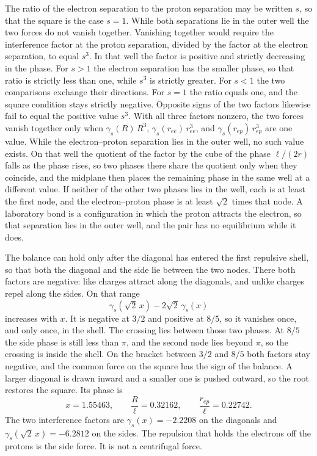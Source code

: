 \documentclass[a4paper]{article}
\begin{document}
The ratio of the electron separation to the proton separation may be written \(s\), so that the square is the case \(s=1\). While both separations lie in the outer well the two forces do not vanish together. Vanishing together would require the interference factor at the proton separation, divided by the factor at the electron separation, to equal \(s^{3}\). In that well the factor is positive and strictly decreasing in the phase. For \(s>1\) the electron separation has the smaller phase, so that ratio is strictly less than one, while \(s^{3}\) is strictly greater. For \(s<1\) the two comparisons exchange their directions. For \(s=1\) the ratio equals one, and the square condition stays strictly negative. Opposite signs of the two factors likewise fail to equal the positive value \(s^{3}\). With all three factors nonzero, the two forces vanish together only when \(\gamma_s(R)\,R^{3}\), \(\gamma_s(r_{ee})\,r_{ee}^{3}\), and \(\gamma_s(r_{ep})\,r_{ep}^{3}\) are one value. While the electron--proton separation lies in the outer well, no such value exists. On that well the quotient of the factor by the cube of the phase \(\ell/(2r)\) falls as the phase rises, so two phases there share the quotient only when they coincide, and the midplane then places the remaining phase in the same well at a different value. If neither of the other two phases lies in the well, each is at least the first node, and the electron--proton phase is at least \(\sqrt{2}\) times that node. A laboratory bond is a configuration in which the proton attracts the electron, so that separation lies in the outer well, and the pair has no equilibrium while it does.

The balance can hold only after the diagonal has entered the first repulsive shell, so that both the diagonal and the side lie between the two nodes. There both factors are negative: like charges attract along the diagonals, and unlike charges repel along the sides. On that range
\[
\gamma_s(\sqrt{2}\,x)-2\sqrt{2}\,\gamma_s(x)
\]
increases with \(x\). It is negative at \(3/2\) and positive at \(8/5\), so it vanishes once, and only once, in the shell. The crossing lies between those two phases. At \(8/5\) the side phase is still less than \(\pi\), and the second node lies beyond \(\pi\), so the crossing is inside the shell. On the bracket between \(3/2\) and \(8/5\) both factors stay negative, and the common force on the square has the sign of the balance. A larger diagonal is drawn inward and a smaller one is pushed outward, so the root restores the square. Its phase is
\[
x=1.55463,
\qquad
\frac{R}{\ell}=0.32162,
\qquad
\frac{r_{ep}}{\ell}=0.22742.
\]
The two interference factors are \(\gamma_s(x)=-2.2208\) on the diagonals and \(\gamma_s(\sqrt{2}\,x)=-6.2812\) on the sides. The repulsion that holds the electrons off the protons is the side force. It is not a centrifugal force.
\end{document}
